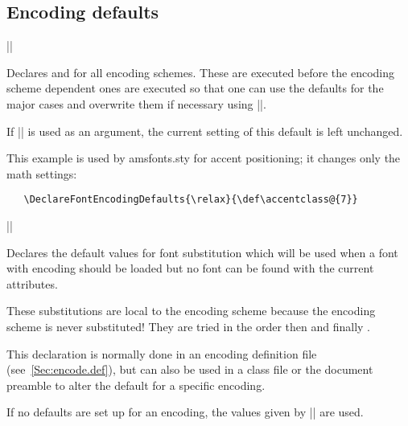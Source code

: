 \documentclass{ltxguide}[1995/11/28]
\begin{document}
 \subsection{Encoding defaults} \label{sec:encoding-defaults}
 
\begin{decl}
|\DeclareFontEncodingDefaults|  
\end{decl}
 
Declares  and  for all encoding
schemes.  These are executed before the encoding scheme dependent ones
are executed so that one can use the defaults for the major cases and
overwrite them if necessary using |\DeclareFontEncoding|.
 
If |\relax| is used as an argument, the current setting of this default
is left unchanged.
 
This example is used by amsfonts.sty for accent positioning; it changes
only the math settings:
\begin{verbatim}
   \DeclareFontEncodingDefaults{\relax}{\def\accentclass@{7}}
\end{verbatim}
 
 
\begin{decl}
|\DeclareFontSubstitution|    
\end{decl}
 
Declares the default values for font substitution which will be used
when a font with encoding 
should be loaded but no font can be found with the current
attributes.
 
These substitutions are local to the encoding scheme because the
encoding scheme is never substituted!  They are tried in the order
 then   and finally .

This declaration is normally done in an encoding definition file
(see~\ref{Sec:encode.def}), but can also be used in a class file or
the document preamble to alter the default for a specific encoding.
 
If no defaults are set up for an encoding, the values given by
|\DeclareErrorFont| are used.
 
\end{document}
